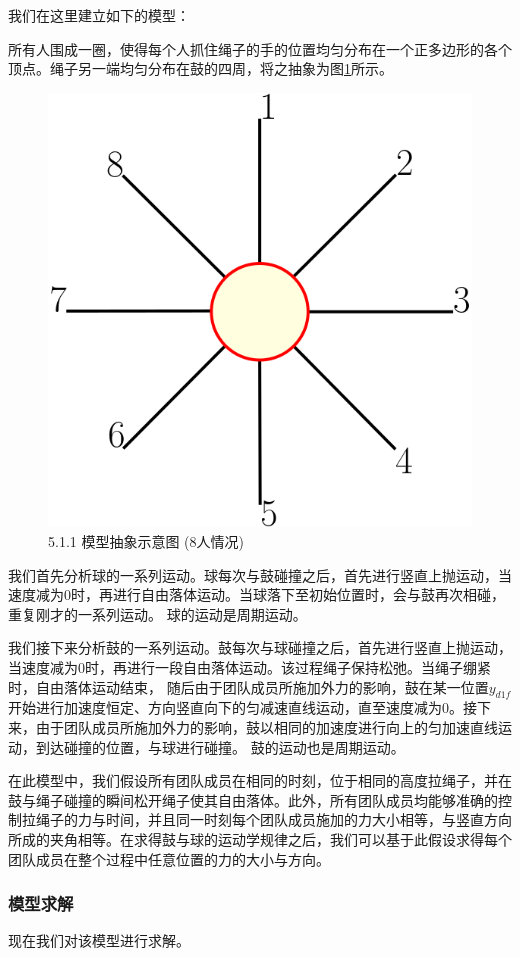\documentclass[nocover]{cumcmart}%
\begin{document}
我们在这里建立如下的模型：

所有人围成一圈，使得每个人抓住绳子的手的位置均匀分布在一个正多边形的各个顶点。绳子另一端均匀分布在鼓的四周，将之抽象为图\ref{5.1.1 模型抽象示意图}所示。
\begin{figure}[h!]
    \centering
    \includegraphics[width=0.4\linewidth]{figures/f1.png}
    \caption{5.1.1 模型抽象示意图 (8人情况)}
    \label{5.1.1 模型抽象示意图}
\end{figure}

我们首先分析球的一系列运动。球每次与鼓碰撞之后，首先进行竖直上抛运动，当速度减为0时，再进行自由落体运动。当球落下至初始位置时，会与鼓再次相碰，重复刚才的一系列运动。
球的运动是周期运动。

我们接下来分析鼓的一系列运动。鼓每次与球碰撞之后，首先进行竖直上抛运动，当速度减为0时，再进行一段自由落体运动。该过程绳子保持松弛。当绳子绷紧时，自由落体运动结束，
随后由于团队成员所施加外力的影响，鼓在某一位置$y_{d1f}$开始进行加速度恒定、方向竖直向下的匀减速直线运动，直至速度减为0。接下来，由于团队成员所施加外力的影响，鼓以相同的加速度进行向上的匀加速直线运动，到达碰撞的位置，与球进行碰撞。
鼓的运动也是周期运动。

在此模型中，我们假设所有团队成员在相同的时刻，位于相同的高度拉绳子，并在鼓与绳子碰撞的瞬间松开绳子使其自由落体。此外，所有团队成员均能够准确的控制拉绳子的力与时间，并且同一时刻每个团队成员施加的力大小相等，与竖直方向所成的夹角相等。在求得鼓与球的运动学规律之后，我们可以基于此假设求得每个团队成员在整个过程中任意位置的力的大小与方向。
\subsubsection{模型求解}
现在我们对该模型进行求解\cite{力学}。
\end{document}
